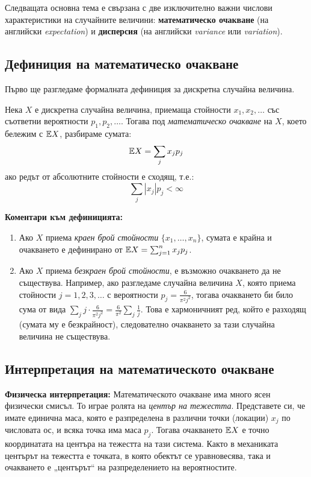 Следващата основна тема е свързана с две изключително важни числови характеристики на случайните величини: \textbf{математическо очакване} (на английски \emph{expectation}) и \textbf{дисперсия} (на английски \emph{variance} или \emph{variation}).

\subsection{Дефиниция на математическо очакване}

Първо ще разгледаме формалната дефиниция за дискретна случайна величина.

\begin{keydefn}
Нека $X$ е дискретна случайна величина, приемаща стойности $x_1, x_2, \dots$ със съответни вероятности $p_1, p_2, \dots$. Тогава под \emph{математическо очакване} на $X$, което бележим с $\mathbb{E} X$, разбираме сумата:
\[ \mathbb{E} X = \sum_{j} x_j p_j \]
ако редът от абсолютните стойности е сходящ, т.е.:
\[ \sum_{j} |x_j| p_j < \infty \]
\end{keydefn}

\textbf{Коментари към дефиницията:}
\begin{enumerate}
    \item Ако $X$ приема \emph{краен брой стойности} $\{x_1, \dots, x_n\}$, сумата е крайна и очакването е дефинирано от $\mathbb{E} X = \sum_{j=1}^n x_j p_j$.
    \item Ако $X$ приема \emph{безкраен брой стойности}, е възможно очакването да не съществува. Например, ако разгледаме случайна величина $X$, която приема стойности $j = 1, 2, 3, \dots$ с вероятности $p_j = \frac{6}{\pi^2 j^2}$, тогава очакването би било сума от вида $\sum_{j} j \cdot \frac{6}{\pi^2 j^2} = \frac{6}{\pi^2} \sum_{j} \frac{1}{j}$. Това е хармоничният ред, който е разходящ (сумата му е безкрайност), следователно очакването за тази случайна величина не съществува.
\end{enumerate}

\subsection{Интерпретация на математическото очакване}

\textbf{Физическа интерпретация:} Математическото очакване има много ясен физически смисъл. То играе ролята на \emph{център на тежестта}. Представете си, че имате единична маса, която е разпределена в различни точки (локации) $x_j$ по числовата ос, и всяка точка има маса $p_j$. Тогава очакването $\mathbb{E} X$ е точно координатата на центъра на тежестта на тази система. Както в механиката центърът на тежестта е точката, в която обектът се уравновесява, така и очакването е „центърът“ на разпределението на вероятностите.

